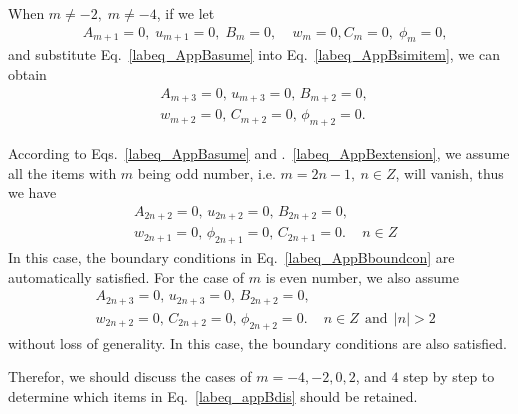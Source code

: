 \documentclass[12pt,sort&compress,fleqn,3p]{elsarticle}
\newcommand{\jiaobiao}[2]{ {#1} _ {#2} }
\begin{document}
When $m\neq-2,\;{m}\neq-4$, if we let
\begin{equation}\label{labeq_AppBasume}
\begin{split}
&\jiaobiao{A}{m+1}=0,\; \jiaobiao{u}{m+1}=0,\; \jiaobiao{B}{m}=0,\;
&\jiaobiao{w}{m}=0,\jiaobiao{C}{m}=0, \; \jiaobiao{\phi}{m}=0,
\end{split}
\end{equation}
and substitute  Eq.~\eqref{labeq_AppBasume} into  Eq.~\eqref{labeq_AppBsimitem},  we can obtain
\begin{equation}\label{labeq_AppBextension}
\begin{split}
&\jiaobiao{A}{m+3}=0,\, \jiaobiao{u}{m+3}=0,\, \jiaobiao{B}{m+2}=0,\, \\
&\jiaobiao{w}{m+2}=0,\,\jiaobiao{C}{m+2}=0, \, \jiaobiao{\phi}{m+2}=0.\;
\end{split}
\end{equation}

According to Eqs.~\eqref{labeq_AppBasume} and .~\eqref{labeq_AppBextension}, we assume  all the  items  with $m$  being  odd number, i.e. $m = 2n-1, ~ n \in Z$,  will  vanish, thus we have
\begin{equation}\label{labeq_AppBextension_odd}
\begin{split}
&\jiaobiao{A}{2n+2}=0,\, \jiaobiao{u}{2n+2}=0,\, \jiaobiao{B}{2n+2}=0,\,\\
&\jiaobiao{w}{2n+1}=0,\,\jiaobiao{\phi}{2n+1}=0, \, \jiaobiao{C}{2n+1}=0.\;    ~~~~ n \in Z
\end{split}
\end{equation}
In this case,  the boundary  conditions  in   Eq.~\eqref{labeq_AppBboundcon}   are automatically satisfied. For the case of  $m$ is even number,   we also assume
\begin{equation}\label{labeq_AppBextension_even}
\begin{split}
&\jiaobiao{A}{2n+3}=0,\, \jiaobiao{u}{2n+3}=0,\, \jiaobiao{B}{2n+2}=0,\,\\
&\jiaobiao{w}{2n+2}=0,\,\jiaobiao{C}{2n+2}=0, \, \jiaobiao{\phi}{2n+2}=0.\;    ~~~~ n \in Z ~~\text{and} ~~|n| >2
\end{split}
\end{equation}
without loss of generality. In this case,  the boundary conditions  are  also  satisfied.


Therefor, we should discuss  the cases of $m = -4, -2 , 0, 2 $, and $4$  step by step  to determine  which items  in  Eq.~\eqref{labeq_appBdis}  should be retained.
\end{document}
